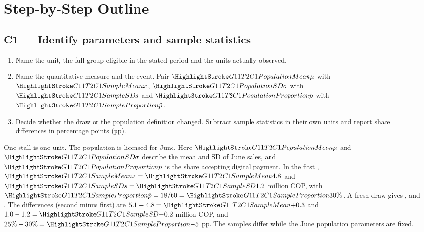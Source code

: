 \begin{center}
\end{center}
\par\nobreak
\secInicio

\section{Step-by-Step Outline}

\subsection{C1 --- Identify parameters and sample statistics}\label{crit:c1}
\begin{enumerate}
  \item Name the unit, the full group eligible in the stated period and the units actually observed.
  \item Name the quantitative measure and the event. Pair \(\PopulationMean{\mu}\) with \(\SampleMean{\bar x}\), \(\PopulationSD{\sigma}\) with \(\SampleSD{s}\) and \(\PopulationShare{p}\) with \(\SampleShare{\hat p}\).
  \item Decide whether the draw or the population definition changed. Subtract sample statistics in their own units and report share differences in percentage points (pp).
\end{enumerate}

 One stall is one unit. The population is  licensed for June. Here \(\PopulationMean{\mu}\) and \(\PopulationSD{\sigma}\) describe the mean and SD of June sales, and \(\PopulationShare{p}\) is the share accepting digital payment. In the first , \(\SampleMean{\bar x}=\SampleMean{4.8}\) and \(\SampleSD{s}=\SampleSD{1.2}\) million COP, with \(\SampleShare{\hat p}=18/60=\SampleShare{30\%}\). A fresh draw gives ,  and . The differences (second minus first) are \(5.1-4.8=\SampleMean{+0.3}\) and \(1.0-1.2=\SampleSD{-0.2}\) million COP, and \(25\%-30\%=\SampleShare{-5}\) pp. The samples differ while the June population parameters are fixed.

